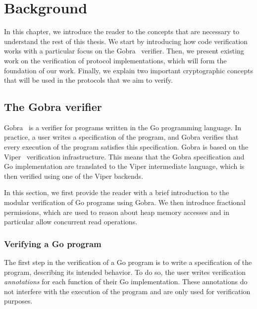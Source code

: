 \chapter{Background}
\label{chap:background}

In this chapter, we introduce the reader to the concepts that are necessary to understand the rest of this thesis.
We start by introducing how code verification works with a particular focus on the Gobra~\cite{wolf2021gobra} verifier.
Then, we present existing work on the verification of protocol implementations, which will form the foundation of our work.
Finally, we explain two important cryptographic concepts that will be used in the protocols that we aim to verify.

\section{The Gobra verifier}
\label{sec:the-gobra-verifier}

Gobra~\cite{wolf2021gobra} is a verifier for programs written in the Go programming language.
In practice, a user writes a specification of the program, and Gobra verifies that every execution of the program satisfies this specification.
Gobra is based on the Viper~\cite{muller2016viper} verification infrastructure. This means that the Gobra specification and Go implementation are translated to the Viper intermediate language, which is then verified using one of the Viper backends.

In this section, we first provide the reader with a brief introduction to the modular verification of Go programs using Gobra.
We then introduce fractional permissions, which are used to reason about heap memory accesses and in particular allow concurrent read operations.

\subsection{Verifying a Go program}
\label{sec:verifying-a-go-program}

The first step in the verification of a Go program is to write a specification of the program, describing its intended behavior.
To do so, the user writes verification \emph{annotations} for each function of their Go implementation.
These annotations do not interfere with the execution of the program and are only used for verification purposes.

